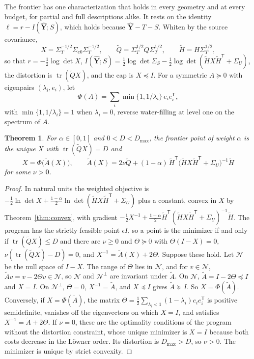\documentclass[11pt,onecolumn]{IEEEtran}
\newtheorem{theorem}{Theorem}
\newcommand{\tr}{\operatorname{tr}}
\newcommand{\hY}{\hat{\mathbf Y}}
\newcommand{\Sez}{\Sigma_{e0}}
\begin{document}
The frontier has one characterization that holds in every geometry and
at every budget, for partial and full descriptions alike. It rests on
the identity $\ell=r-I(\hY;S)$, which holds because $\hY-T-S$. Whiten by
the source covariance,
\[
X=\Sigma_T^{-1/2}\Sez\Sigma_T^{-1/2},\qquad
\tilde Q=\Sigma_T^{1/2}Q\Sigma_T^{1/2},\qquad
\tilde H=H\Sigma_T^{1/2},
\]
so that $r=-\tfrac12\log\det X$,
$I(\hY;S)=\tfrac12\log\det\Sigma_S-\tfrac12\log\det(\tilde HX\tilde H^{\mathsf T}+\Sigma_U)$,
the distortion is $\tr(\tilde QX)$, and the cap is $X\preceq I$. For a
symmetric $A\succeq0$ with eigenpairs $(\lambda_i,e_i)$, let
\[
\Phi(A)=\sum_i\min\{1,1/\lambda_i\}\,e_ie_i^{\mathsf T},
\]
with $\min\{1,1/\lambda_i\}=1$ when $\lambda_i=0$, reverse water-filling at
level one on the spectrum of $A$.

\begin{theorem}\label{thm:tilted}
For $\alpha\in[0,1]$ and $0<D<D_{\max}$, the frontier point of weight
$\alpha$ is the unique $X$ with $\tr(\tilde QX)=D$ and
\begin{equation}
X=\Phi\bigl(\tilde A(X)\bigr),\qquad
\tilde A(X)=2\nu\tilde Q+(1-\alpha)\,\tilde H^{\mathsf T}\bigl(\tilde HX\tilde H^{\mathsf T}+\Sigma_U\bigr)^{-1}\tilde H
\label{eq:tilted}
\end{equation}
for some $\nu>0$.
\end{theorem}

\begin{proof}
In natural units the weighted objective is
$-\tfrac12\ln\det X+\tfrac{1-\alpha}2\ln\det(\tilde HX\tilde H^{\mathsf T}+\Sigma_U)$
plus a constant, convex in $X$ by Theorem~\ref{thm:convex}, with
gradient $-\tfrac12X^{-1}+\tfrac{1-\alpha}2\tilde H^{\mathsf T}(\tilde HX\tilde H^{\mathsf T}+\Sigma_U)^{-1}\tilde H$.
The program has the strictly feasible point $\epsilon I$, so a point is
the minimizer if and only if $\tr(\tilde QX)\le D$ and there are $\nu\ge0$
and $\Theta\succeq0$ with $\Theta(I-X)=0$, $\nu(\tr(\tilde QX)-D)=0$, and
$X^{-1}=\tilde A(X)+2\Theta$. Suppose these hold.
Let $\mathcal N$ be the null space of $I-X$. The range of $\Theta$ lies in
$\mathcal N$, and for $v\in\mathcal N$, $\tilde Av=v-2\Theta v\in\mathcal N$,
so $\mathcal N$ and $\mathcal N^\perp$ are invariant under $\tilde A$. On
$\mathcal N$, $\tilde A=I-2\Theta\preceq I$ and $X=I$. On $\mathcal N^\perp$,
$\Theta=0$, $X^{-1}=\tilde A$, and $X\preceq I$ gives $\tilde A\succeq I$.
So $X=\Phi(\tilde A)$. Conversely, if $X=\Phi(\tilde A)$, the matrix
$\Theta=\tfrac12\sum_{\lambda_i<1}(1-\lambda_i)e_ie_i^{\mathsf T}$ is
positive semidefinite, vanishes off the eigenvectors on which $X=I$, and
satisfies $X^{-1}=\tilde A+2\Theta$. If $\nu=0$, these are the optimality
conditions of the program without the distortion constraint, whose
unique minimizer is $X=I$ because both costs decrease in the L\"owner
order. Its distortion is $D_{\max}>D$, so $\nu>0$. The minimizer is
unique by strict convexity.
\end{proof}
\end{document}
